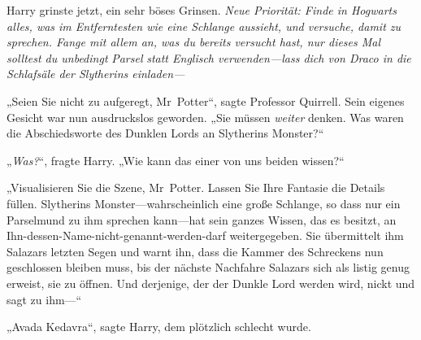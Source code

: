 Harry grinste jetzt, ein sehr böses Grinsen. \emph{Neue Priorität: Finde in Hogwarts alles, was im Entferntesten wie eine Schlange aussieht, und versuche, damit zu sprechen. Fange mit allem an, was du bereits versucht hast, nur dieses Mal solltest du unbedingt} \emph{Parsel} \emph{statt Englisch verwenden—lass dich von Draco in die Schlafsäle der Slytherins einladen—}

„Seien Sie nicht zu aufgeregt, Mr~Potter“, sagte Professor Quirrell. Sein eigenes Gesicht war nun ausdruckslos geworden. „Sie müssen \emph{weiter} denken. Was waren die Abschiedsworte des Dunklen Lords an Slytherins Monster?“

„\emph{Was?}“, fragte Harry. „Wie kann das einer von uns beiden wissen?“

„Visualisieren Sie die Szene, Mr~Potter. Lassen Sie Ihre Fantasie die Details füllen. Slytherins Monster—wahrscheinlich eine große Schlange, so dass nur ein Parselmund zu ihm sprechen kann—hat sein ganzes Wissen, das es besitzt, an Ihn-dessen-Name-nicht-genannt-werden-darf weitergegeben. Sie übermittelt ihm Salazars letzten Segen und warnt ihn, dass die Kammer des Schreckens nun geschlossen bleiben muss, bis der nächste Nachfahre Salazars sich als listig genug erweist, sie zu öffnen. Und derjenige, der der Dunkle Lord werden wird, nickt und sagt zu ihm—“

„Avada Kedavra“, sagte Harry, dem plötzlich schlecht wurde.

